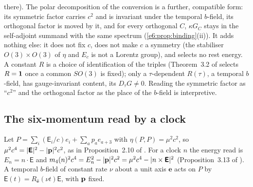 \begin{remark}
\begin{enumerate}[label=(\alph*),leftmargin=2.2em]
there). The polar decomposition of the conversion is a further, compatible form: its symmetric factor carries $c^2$ and is invariant under the
temporal $b$-field, its orthogonal factor is moved by it, and for every orthogonal $C$, $\kappa G_C$ stays in the self-adjoint summand with the same
spectrum (\cref{e6:prop:binding}(ii)). It adds nothing else: it does not fix $c$, does not make $c$ a symmetry (the stabiliser $O(3)\times O(3)$ of $\eta$
and $E_c$ is not a Lorentz group), and selects no rest energy. A constant $R$ is a choice of identification of the triples (Theorem~3.2 of
\cite{ES17} selects $R=\mathbf 1$ once a common $SO(3)$ is fixed); only a $\tau$-dependent $R(\tau)$, a temporal $b$-field, has gauge-invariant content, its
$D_\tau G\neq0$. Reading the symmetric factor as ``$c^2$'' and the orthogonal factor as the place of the $b$-field is interpretive.
\end{enumerate}
\end{remark}

\subsection{The six-momentum read by a clock}
\label{e6:sec:clock}

Let $P=\sum_i(\mathsf E_i/c)e_i+\sum_ap_ae_{a+3}$ with $\eta(P,P)=\mu^2c^2$, so $\mu^2c^4=|\boldsymbol{\mathsf E}|^2-|\mathbf p|^2c^2$, as in Proposition~2.10 of \cite{RE}.
For a clock $n$ the energy read is $E_n=n\cdot\boldsymbol{\mathsf E}$ and $m_4(n)^2c^4=E_n^2-|\mathbf p|^2c^2=\mu^2c^4-|n\times\boldsymbol{\mathsf E}|^2$ (Proposition~3.13 of
\cite{TR}). A temporal $b$-field of constant rate $\nu$ about a unit axis $\hat{\mathbf e}$ acts on $P$ by $\boldsymbol{\mathsf E}(t)=R_{\hat{\mathbf e}}(\nu t)\boldsymbol{\mathsf E}$,
with $\mathbf p$ fixed.


